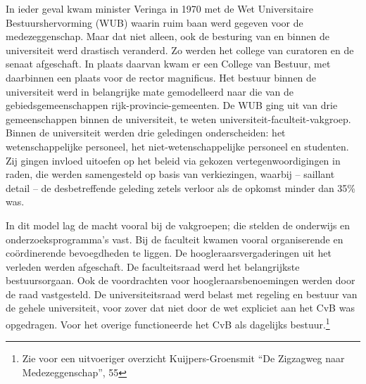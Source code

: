 \documentclass[empirical, authordate, ]{new-jote-article}
\begin{document}
	In ieder geval kwam minister Veringa in 1970 met de Wet Universitaire Bestuurshervorming (WUB) waarin ruim baan werd gegeven voor de medezeggenschap. Maar dat niet alleen, ook de besturing van en binnen de universiteit werd drastisch veranderd. Zo werden het college van curatoren en de senaat afgeschaft. In plaats daarvan kwam er een College van Bestuur, met daarbinnen een plaats voor de rector magnificus. Het bestuur binnen de universiteit werd in belangrijke mate gemodelleerd naar die van de gebiedsgemeenschappen rijk-provincie-gemeenten. De WUB ging uit van drie gemeenschappen binnen de universiteit, te weten universiteit-faculteit-vakgroep. Binnen de universiteit werden drie geledingen onderscheiden: het wetenschappelijke personeel, het niet-wetenschappelijke personeel en studenten. Zij gingen invloed uitoefen op het beleid via gekozen vertegenwoordigingen in raden, die werden samengesteld op basis van verkiezingen, waarbij -- saillant detail -- de desbetreffende geleding zetels verloor als de opkomst minder dan 35\% was.



	In dit model lag de macht vooral bij de vakgroepen; die stelden de onderwijs en onderzoeksprogramma's vast. Bij de faculteit kwamen vooral organiserende en coördinerende bevoegdheden te liggen. De hoogleraarsvergaderingen uit het verleden werden afgeschaft. De faculteitsraad werd het belangrijkste bestuursorgaan. Ook de voordrachten voor hoogleraarsbenoemingen werden door de raad vastgesteld. De universiteitsraad werd belast met regeling en bestuur van de gehele universiteit, voor zover dat niet door de wet expliciet aan het CvB was opgedragen. Voor het overige functioneerde het CvB als dagelijks bestuur.\footnote{Zie voor een uitvoeriger overzicht Kuijpers-Groensmit “De Zigzagweg naar Medezeggenschap”, 55}
\end{document}
